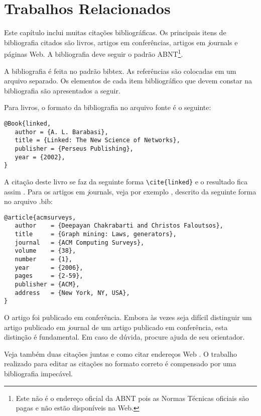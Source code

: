 %
%

\chapter{Trabalhos Relacionados}

Este capítulo inclui muitas citações bibliográficas. Os principais
itens de bibliografia citados são livros, artigos em conferências,
artigos em {\textit journals} e páginas Web. A bibliografia deve seguir o
padrão ABNT\footnote{Este não é o endereço oficial da
ABNT pois as Normas Técnicas oficiais são pagas e não estão disponíveis na Web.}.

A bibliografia é feita no padrão {\ttfamily bibtex}.
As referências são colocadas em um arquivo separado.
Os elementos de cada item bibliográfico que devem constar na bibliografia são apresentados a seguir.

Para livros, o formato da bibliografia no arquivo fonte é o seguinte:

\begin{verbatim}
@Book{linked,
   author = {A. L. Barabasi},
   title = {Linked: The New Science of Networks},
   publisher = {Perseus Publishing},
   year = {2002},
}
\end{verbatim}

A citação deste livro se faz da seguinte forma \verb#\cite{linked}# e o resultado fica assim \cite{linked}.
Para os artigos em {\textit journals}, veja por exemplo \cite{acmsurveys},
descrito da seguinte forma no arquivo {\ttfamily .bib}:

\begin{verbatim}
@article{acmsurveys,
   author    = {Deepayan Chakrabarti and Christos Faloutsos},
   title     = {Graph mining: Laws, generators},
   journal   = {ACM Computing Surveys},
   volume    = {38},
   number    = {1},
   year      = {2006},
   pages     = {2-59},
   publisher = {ACM},
   address   = {New York, NY, USA},
}
\end{verbatim}

O artigo \cite{3faloutsos} foi publicado em conferência. Embora
às vezes seja difícil distinguir um artigo publicado em {\textit
 journal} de um artigo publicado em conferência, esta distinção é
fundamental. Em caso de dúvida, procure ajuda de seu orientador.

Veja também duas citações juntas \cite{rp99,mar00} e como citar
endereços Web \cite{irl:06}.
O trabalho realizado para editar as citações no formato correto é
compensado por uma bibliografia impecável.

